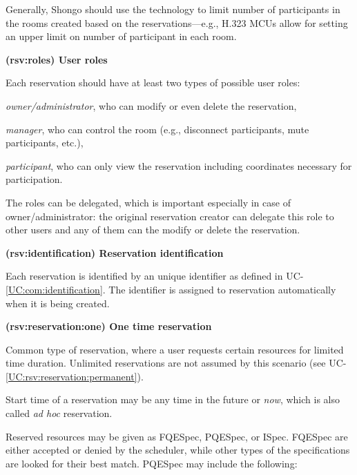 \documentclass[a4paper]{report}
\makeatletter
\newcounter{UCcounter}
\newenvironment{UseCases}%
	{\begin{list}{\textbf{UC-\arabic{UCcounter}}}{\@nmbrlisttrue\def\@listctr{UCcounter}}}%
	{\end{list}}
\newcommand{\UClabel}[1]{\label{UC:#1}}
\newcommand{\UCref}[1]{UC-\ref{UC:#1}}
\newcommand{\UseCase}[2]{\item\UClabel{#2} \textbf{(#2) #1}\\ \nopagebreak}
\makeatother
\begin{document}
\begin{UseCases}
Generally, Shongo should use the technology to limit number of participants in
the rooms created based on the reservations---e.g., H.323 MCUs allow for
setting an upper limit on number of participant in each room.

\UseCase{User roles}{rsv:roles}

Each reservation should have at least two types of possible user roles:

\begin{compactitem}

\item \emph{owner/administrator}, who can modify or even delete the reservation,

\item \emph{manager}, who can control the room (e.g., disconnect participants, mute participants, etc.),

\item \emph{participant}, who can only view the reservation including coordinates necessary for participation.

\end{compactitem}

The roles can be delegated, which is important especially in case of owner/administrator: the original reservation creator can delegate this role to other users and any of them can the modify or delete the reservation.


\UseCase{Reservation identification}{rsv:identification}

Each reservation is identified by an unique identifier as defined in \UCref{com:identification}. The identifier is assigned to reservation automatically when it is being created.

\UseCase{One time reservation}{rsv:reservation:one}

Common type of reservation, where a user requests certain resources for limited
time duration. Unlimited reservations are not assumed by this scenario (see
\UCref{rsv:reservation:permanent}).

Start time of a reservation may be any time in the future or \emph{now}, which
is also called \emph{ad hoc} reservation.

Reserved resources may be given as FQESpec, PQESpec, or ISpec. FQESpec are
either accepted or denied by the scheduler, while other types of the
specifications are looked for their best match. PQESpec may include the
following:

\begin{compactitem}


\end{compactitem}
\end{UseCases}
\end{document}
